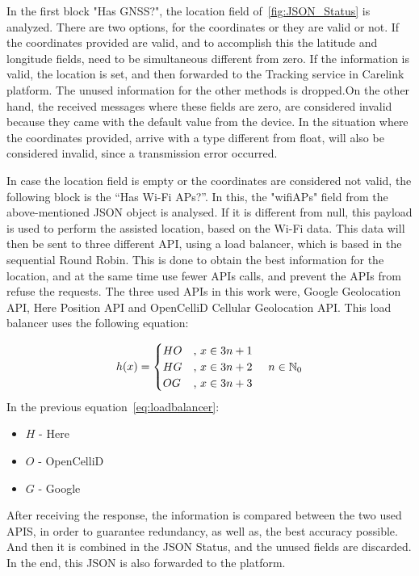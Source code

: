 In the first block "Has GNSS?", the location field of~\ref{fig:JSON_Status} is analyzed. There are two options, for the coordinates or they are valid or not. If the coordinates provided are valid, and to accomplish this the latitude and longitude fields, need to be simultaneous different from zero. If the information is valid, the location is set, and then forwarded to the Tracking service in Carelink platform. The unused information for the other methods is dropped.\newline On the other hand, the received messages where these fields are zero, are considered invalid because they came with the default value from the device. In the situation where the coordinates provided, arrive with a type different from float, will also be considered invalid, since a transmission error occurred.


\newpage

In case the location field is empty or the coordinates are considered not valid, the following block is the “Has Wi-Fi APs?”. In this, the "wifiAPs"  field from the above-mentioned JSON object is analysed. If it is different from null, this payload is used to perform the assisted location, based on the Wi-Fi data. This data will then be sent to three different API,  using a load balancer, which is  based in the sequential Round Robin. This is done to obtain the best information for the location, and at the same time use fewer APIs calls, and prevent the APIs from refuse the requests. The three used APIs in this work were, Google Geolocation API, Here Position API and OpenCelliD Cellular Geolocation API. This load balancer uses the following equation:

\begin{equation} \label{eq:loadbalancer}
    h(x) = \begin{cases}
        HO & \text{, }x \in {3n+1}\\
        HG & \text{, }x \in {3n+2}
        \hspace{5mm} n \in \mathbb{N}_{0} \\
        OG & \text{, }x \in {3n+3}
        \end{cases} 
\end{equation}
In the previous equation~\ref{eq:loadbalancer}:
\begin{itemize}
	\item {$H$} - Here 
	\item {$O$} - OpenCelliD
	\item {$G$} - Google

\end{itemize} 
After receiving the response, the information is compared between the two used APIS, in order to guarantee redundancy, as well as, the best accuracy possible. And then it is combined in the JSON Status, and the unused fields are discarded. In the end, this JSON is also forwarded to the platform.

